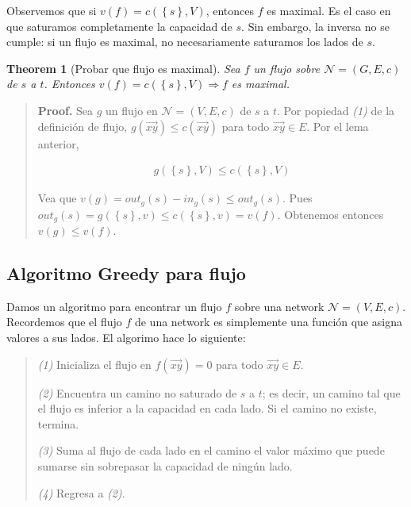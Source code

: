 \documentclass[a4paper, 12pt]{article}
\newtheorem{theorem}{Theorem}
\newtheorem{theorem}{Theorem}
\begin{document}
Observemos que si $v(f) = c(\left\{ s \right\}, V)$, entonces $f$ es maximal. Es
el caso en que saturamos completamente la capacidad de $s$. Sin embargo, la
inversa no se cumple: si un flujo es maximal, no necesariamente saturamos los
lados de $s$.

\begin{theorem}[Probar que flujo es maximal]
    Sea $f$ un flujo sobre $\mathcal{N} = (G, E, c)$ de $s$ a $t$. Entonces
    $v(f) = c(\left\{ s \right\}, V) \Rightarrow f$ es maximal.
\end{theorem}


\small
\begin{quote}

\textbf{Proof.} Sea $g$ un flujo en $\mathcal{N} = (V, E, c)$ de $s$ a $t$. Por
popiedad \textit{(1)} de la definición de flujo, $g(\overrightarrow{xy}) \leq c(\overrightarrow{xy})$
para todo $\overrightarrow{xy} \in E$. Por el lema anterior, 

\begin{align*} g(\left\{ s \right\}, V) \leq c( \left\{ s \right\}, V  )\end{align*}

Vea que $v(g) = out_g(s) - in_g(s) \leq out_g(s)$. Pues $out_g(s) = g(\left\{ s
\right\}, v ) \leq c(\left\{ s \right\}, v ) = v(f)$. Obtenemos entonces $v(g)
\leq v(f)$.

\end{quote}
\normalsize

\subsection{Algoritmo Greedy para flujo}

Damos un algoritmo para encontrar un flujo $f$ sobre una network $\mathcal{N} =
(V, E, c)$. Recordemos que el flujo $f$ de una network es simplemente una
función que asigna valores a sus lados. El algorimo hace lo siguiente:

\begin{quote}

    \textit{(1)} Inicializa el flujo en $f(\overrightarrow{xy}) = 0$ para todo $\overrightarrow{xy}
    \in E$. 

    \textit{(2)} Encuentra un camino no saturado de $s$ a $t$; es decir, un
    camino tal que el flujo es inferior a la capacidad en cada lado. Si el
    camino no existe, termina.

    \textit{(3)} Suma al flujo de cada lado en el camino el valor máximo que
    puede sumarse sin sobrepasar la capacidad de ningún lado.

    \textit{(4)} Regresa a \textit{(2)}.
    
\end{quote}
\end{document}
